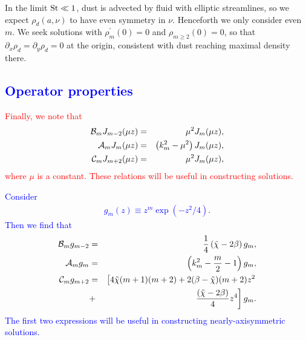 \documentclass[apj]{emulateapj}
\def\blue#1{\textcolor{blue}{#1}}
\def\red#1{\textcolor{red}{#1}}
\newcommand{\beqn}{\begin{eqnarray}}
\newcommand{\eeqn}{\end{eqnarray}}
\newcommand{\tilchi}{\tilde\chi}
\newcommand{\St}{{\rm St}}
\begin{document}
In the limit $\St\ll 1$, dust is advected by fluid with elliptic
streamlines, so we expect $\rho_d(a,\nu)$ to have even symmetry in
$\nu$. Henceforth we only consider even $m$. We seek solutions with  
$\rho_m^\prime(0)=0$ and $\rho_{m\geq2}(0)=0$, so that
$\partial_x\rho_d=\partial_y\rho_d=0$ at the origin, consistent with 
dust reaching maximal density there.  

\blue{\subsection{Operator properties}}

\red{
Finally, we note that
\beqn\label{eq:ops2}
\mathcal{B}_mJ_{m-2}(\mu z) &=& \mu^2J_m(\mu z),\notag\\
\mathcal{A}_mJ_m(\mu z) &=& \left(k_m^2 - \mu^2\right)J_m(\mu z),\notag\\
\mathcal{C}_mJ_{m+2}(\mu z) &= & \mu^2J_m(\mu z),\notag
\eeqn
where $\mu$ is a constant. These relations will be useful in
constructing solutions.}

\blue{
Consider 
\begin{align}
	g_m(z) \equiv z^m\exp{(-z^2/4)}.
\end{align}
Then we find that 
\beqn
\mathcal{B}_mg_{m-2} &=&\frac{1}{4}\left(\tilchi - 2\beta\right)g_m,\\
\mathcal{A}_mg_m &=& \left(k_m^2 - \frac{m}{2} - 1\right)g_m,\\
\mathcal{C}_mg_{m+2}&=& \left[4\tilchi(m+1)(m+2) +2(\beta-\tilchi)(m+2)z^2 \right.
\notag\\ &+&\left. \frac{\left(\tilchi - 2\beta\right)}{4}z^4\right]g_m. 
\eeqn
The first two expressions will be useful in constructing nearly-axisymmetric solutions. 
}
\end{document}
